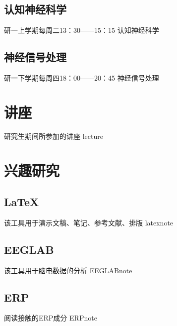 \documentclass[12pt,a4paper]{book} %
\begin{document}
\section{认知神经科学}
\indent 研一上学期每周二13：30——15：15
{认知神经科学}
\section{神经信号处理}
\indent 研一下学期每周四18：00——20：45
{神经信号处理}
\chapter{讲座}
\indent 研究生期间所参加的讲座
{lecture}
\chapter{兴趣研究}
\section{\LaTeX}
\indent 该工具用于演示文稿、笔记、参考文献、排版
{latexnote}
\section{EEGLAB}
\indent 该工具用于脑电数据的分析
{EEGLABnote}
\section{ERP}
\indent 阅读接触的ERP成分
{ERPnote}
\appendix
\backmatter
% 
\printindex %
\end{document}
